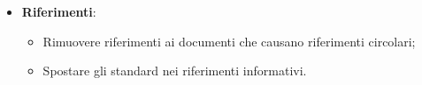 \begin{itemize}
{\begin{itemize}
\begin{itemize}
				\item Spostare metriche vicino alle attività a cui esse riferiscono per una maggiore facilità di lettura;
				\item Spostare norme sul versionamento in Processi di supporto;
				\item Correggere la definizione del PDCA.
			\end{itemize}
			\item \textbf{Riferimenti}:
			\begin{itemize}
				\item Rimuovere riferimenti ai documenti che causano riferimenti circolari;
				\item Spostare gli standard nei riferimenti informativi.
			\end{itemize}
		\end{itemize}}	

\end{itemize}

